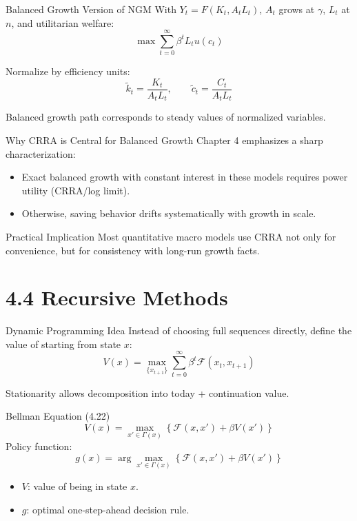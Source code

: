 \documentclass[aspectratio=169,10pt]{beamer}
\newcommand{\apxbutton}[1]{\hfill\hyperlink{#1}{\beamerbutton{Appendix}}}
\begin{document}
\begin{frame}{Balanced Growth Version of NGM}
With $Y_t=F(K_t,A_tL_t)$, $A_t$ grows at $\gamma$, $L_t$ at $n$, and utilitarian welfare:
\[
\max \sum_{t=0}^{\infty}\beta^t L_t u(c_t)
\]

Normalize by efficiency units:
\[
\tilde{k}_t=\frac{K_t}{A_tL_t},\qquad \tilde{c}_t=\frac{C_t}{A_tL_t}
\]

Balanced growth path corresponds to steady values of normalized variables.
\end{frame}

\begin{frame}{Why CRRA is Central for Balanced Growth}
Chapter 4 emphasizes a sharp characterization:
\begin{itemize}
  \item Exact balanced growth with constant interest in these models requires power utility (CRRA/log limit).
  \item Otherwise, saving behavior drifts systematically with growth in scale.
\end{itemize}

\begin{block}{Practical Implication}
Most quantitative macro models use CRRA not only for convenience, but for consistency with long-run growth facts.
\end{block}
\end{frame}

\section{4.4 Recursive Methods}

\begin{frame}{Dynamic Programming Idea}
\hypertarget{m-a7}{}
Instead of choosing full sequences directly, define the value of starting from state $x$:
\[
V(x)=\max_{\{x_{t+1}\}}\sum_{t=0}^{\infty}\beta^t\mathcal{F}(x_t,x_{t+1})
\]

Stationarity allows decomposition into today + continuation value.
\apxbutton{a7}
\end{frame}

\begin{frame}{Bellman Equation (4.22)}
\[
V(x)=\max_{x'\in\Gamma(x)}\left\{\mathcal{F}(x,x')+\beta V(x')\right\}
\]
Policy function:
\[
g(x)=\arg\max_{x'\in\Gamma(x)}\left\{\mathcal{F}(x,x')+\beta V(x')\right\}
\]

\begin{itemize}
  \item $V$: value of being in state $x$.
  \item $g$: optimal one-step-ahead decision rule.
\end{itemize}
\end{frame}
\end{document}
